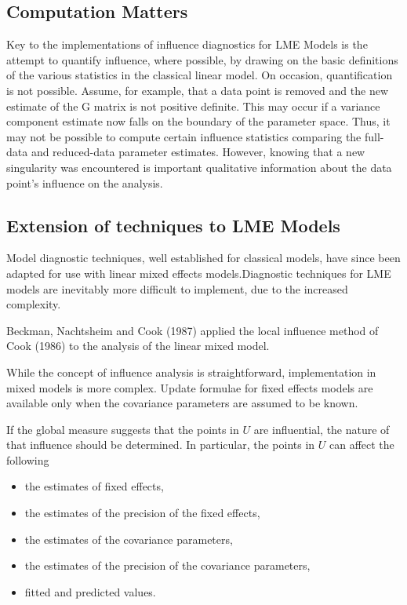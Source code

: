 \documentclass[12pt, a4paper]{report}
\theoremstyle{plain}
\theoremstyle{definition}
\theoremstyle{remark}
\begin{document}



\subsection{Computation Matters}
Key to the implementations of influence diagnostics for LME Models is the attempt to quantify influence, where possible, by drawing on the basic definitions of the various statistics in the classical linear	model. 
On occasion, quantification is not possible. Assume, for example, that a data point is removed
and the new estimate of the G matrix is not positive definite. This may occur if a variance component estimate now falls on the boundary of the parameter space. Thus, it may not be possible to compute certain influence statistics comparing the full-data and reduced-data parameter estimates. However, knowing that a new singularity was encountered is important qualitative information about the data point’s influence on	the analysis.

\subsection{Extension of techniques to LME Models} %

Model diagnostic techniques, well established for classical models, have since been adapted for use with linear mixed effects models.Diagnostic techniques for LME models are inevitably more difficult to implement, due to the increased complexity.

Beckman, Nachtsheim and Cook (1987) \citet{Beckman} applied the local influence method of Cook (1986) to the analysis of the linear mixed model.

While the concept of influence analysis is straightforward, implementation in mixed models is more complex. Update formulae for fixed effects models are available only when the covariance parameters are assumed to be known.

If the global measure suggests that the points in $U$ are influential, the nature of that influence should be determined. In particular, the points in $U$ can affect the following

\begin{itemize}
	\item the estimates of fixed effects,
	\item the estimates of the precision of the fixed effects,
	\item the estimates of the covariance parameters,
	\item the estimates of the precision of the covariance parameters,
	\item fitted and predicted values.
\end{itemize}
\end{document}
